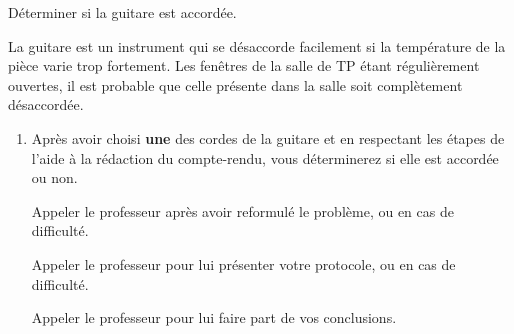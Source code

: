 \documentclass[12pt,a4paper]{article}
\begin{document}
\newpage

\begin{objectif}
Déterminer si la guitare est accordée.
\end{objectif}

La guitare est un instrument qui se désaccorde facilement si la température de la pièce varie trop fortement.
Les fenêtres de la salle de TP étant régulièrement ouvertes, il est probable que celle présente dans la salle soit complètement désaccordée.

\begin{enumerate}[resume]
\item \app{} \anarai{} \rea{} \val{} \com{}

Après avoir choisi \textbf{une} des cordes de la guitare et en respectant les étapes de l'aide à la rédaction du compte-rendu, vous déterminerez si elle est accordée ou non.

Appeler le professeur après avoir reformulé le problème, ou en cas de difficulté.
\appelprof{\app}

Appeler le professeur pour lui présenter votre protocole, ou en cas de difficulté.
\appelprof{\anarai}

Appeler le professeur pour lui faire part de vos conclusions.
\appelprof{}

\end{enumerate}

\newpage

\end{document}

